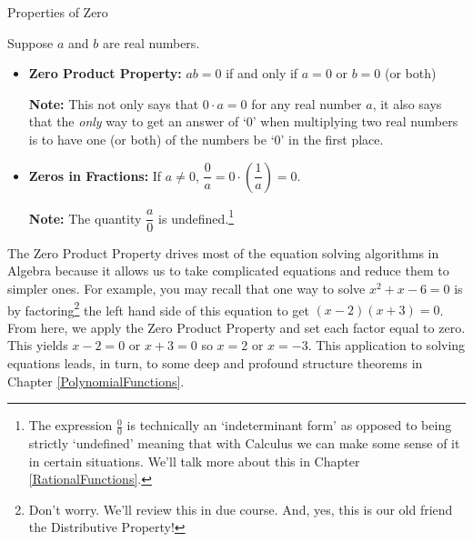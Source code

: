 \begin{floatbox}[label=box:propertiesofzero]{Properties of Zero}

Suppose $a$ and $b$ are real numbers.

\begin{itemize}

\item  \textbf{Zero Product Property:} $ab = 0$ if and only if $a=0$ or $b=0$ (or both)

\textbf{Note:} This not only says that $0 \cdot a = 0$ for any real number $a$, it also says that the \textit{only} way to get an answer of `$0$' when multiplying two real numbers  is to have one (or both) of the numbers be `$0$' in the first place.

\item  \textbf{Zeros in Fractions:}  If $a \neq 0$, $\dfrac{0}{a} = 0 \cdot \left(\dfrac{1}{a}\right) = 0$.

\textbf{Note:}  The quantity $\dfrac{a}{0}$ is undefined.\footnote{The expression $\frac{0}{0}$ is technically an `indeterminant form' as opposed to being strictly `undefined' meaning that with Calculus we can make some sense of it in certain situations.  We'll talk more about this in Chapter \ref{RationalFunctions}.}

\end{itemize}

\end{floatbox}

The Zero Product Property drives most of the equation solving algorithms in Algebra because it allows us to take complicated equations and reduce them to simpler ones.  For example, you may recall that one way to solve  $x^2+x-6=0$ is by factoring\footnote{Don't worry.  We'll review this in due course.  And, yes, this is our old friend the Distributive Property!} the left hand side of this equation to get  $(x-2)(x+3) = 0$.  From here, we apply the Zero Product Property and set each factor equal to zero.  This yields  $x-2=0$ or $x+3=0$ so $x=2$ or $x=-3$.  This application to solving equations leads, in turn,  to some deep and profound structure theorems in Chapter \ref{PolynomialFunctions}. 

